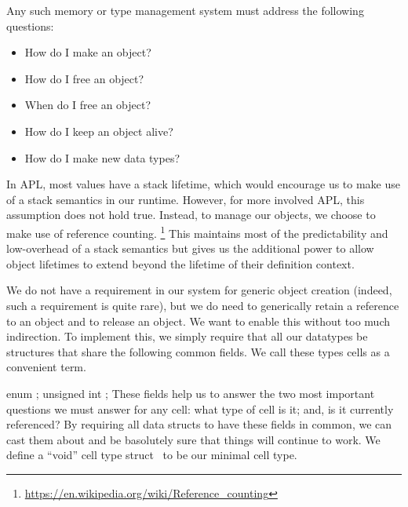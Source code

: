 \documentclass{article}%
\newcommand*\noun[1]{\textsf{#1}}
\begin{document}
Any such memory or type management system
must address the following questions:

\begin{itemize}
        \item How do I make an object?
        \item How do I free an object?
        \item When do I free an object?
        \item How do I keep an object alive?
        \item How do I make new data types?
\end{itemize}

In APL, most values have a stack lifetime,
which would encourage us to make use
of a stack semantics in our runtime.
However, for more involved APL,
this assumption does not hold true.
Instead, to manage our objects,
we choose to make use of reference counting.%
\footnote{\url{https://en.wikipedia.org/wiki/Reference\_counting}}
This maintains most of the predictability and low-overhead
of a stack semantics but gives us the additional power
to allow object lifetimes to extend beyond the lifetime
of their definition context.

We do not have a requirement in our system for generic object creation
(indeed, such a requirement is quite rare), 
but we do need to generically retain a reference
to an object and to release an object.
We want to enable this
without too much indirection.
To implement this, we simply require
that all our datatypes be structures that share
the following common fields. 
We call these types \noun{cells} as a convenient term.

\nwenddocs{}\endmoddef\nwstartdeflinemarkup{}\nwenddeflinemarkup
enum  ;
unsigned int ;
\eatline
{}\nwendcode{}\nwdocspar
These fields help us to answer the two most important questions
we must answer for any cell:
what type of cell is it; and, is it currently referenced?
By requiring all data structs to have these fields in common,
we can cast them about and be basolutely sure
that things will continue to work.
We define a ``void'' cell type {\Tt{}struct\ \nwendquote}
to be our minimal cell type.
\end{document}
